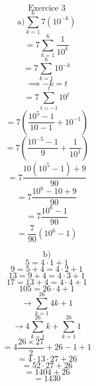 \documentclass{article}
\begin{document}
\[ \text{Exercice 3} \]
\[ \text{a)} \sum_{k=1}^6 7(10^{-k}) \]
\[ = 7 \sum_{k=1}^6 \frac{1}{10^k} \]
\[ = 7 \sum_{k=1}^6 10^{-k} \]
\[ \implies -k = t\]
\[ = 7 \sum_{t=-1}^t 10^{t} \]
\[ = 7 \left( \frac{10^{5}-1}{10-1} +10^{-1}\right) \]
\[ = 7 \left( \frac{10^{-5} - 1}{9} + \frac{1}{10^1} \right) \]
\[ = 7 \frac{10(10^5-1) + 9}{90} \]
\[ = 7 \frac{10^6 - 10+9}{90} \]
\[ = 7 \frac{10^6 - 1}{90} \]
\[ = \frac{7}{90}(10^6 - 1) \]

\[ \text{b)} \]
\[ 5 = 4 \cdot 1 + 1 \]
\[ 9 = 5 + 4 = 4 \cdot 2 + 1 \]
\[ 13 = 9 + 4 = 4 \cdot 3 + 1 \]
\[ 17 = 13 + 4 = 4 \cdot 4 + 1 \]
\[ 105 = 26 \cdot 4 + 1 \]
\[ \to \sum_{k=1}^{26} 4k+1 \]
\[ \to 4 \sum_{k=1}^{26} k + \sum_{k=1}^{26} 1 \]
\[ = 4 \frac{26 \times 27}{2} + 26 - 1 + 1 \]
\[ = 4 \cdot 13 \cdot 27 + 26 \]
\[ = 52 \cdot 27 + 26 \]
\[ = 1404 + 26 \]
\[ = 1430 \]
\end{document}
